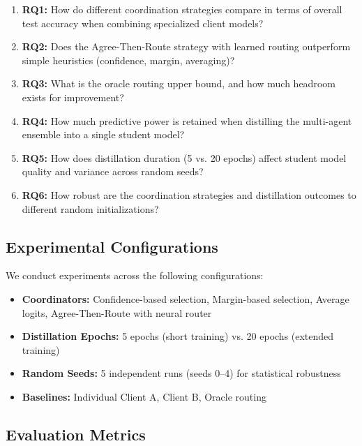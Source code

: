 \documentclass[12pt]{article}
\begin{document}
\begin{enumerate}
    \item \textbf{RQ1:} How do different coordination strategies compare in terms of overall test accuracy when combining specialized client models?
    
    \item \textbf{RQ2:} Does the Agree-Then-Route strategy with learned routing outperform simple heuristics (confidence, margin, averaging)?
    
    \item \textbf{RQ3:} What is the oracle routing upper bound, and how much headroom exists for improvement?
    
    \item \textbf{RQ4:} How much predictive power is retained when distilling the multi-agent ensemble into a single student model?
    
    \item \textbf{RQ5:} How does distillation duration (5 vs. 20 epochs) affect student model quality and variance across random seeds?
    
    \item \textbf{RQ6:} How robust are the coordination strategies and distillation outcomes to different random initializations?
\end{enumerate}

\subsection{Experimental Configurations}

We conduct experiments across the following configurations:

\begin{itemize}
    \item \textbf{Coordinators:} Confidence-based selection, Margin-based selection, Average logits, Agree-Then-Route with neural router
    \item \textbf{Distillation Epochs:} 5 epochs (short training) vs. 20 epochs (extended training)
    \item \textbf{Random Seeds:} 5 independent runs (seeds 0--4) for statistical robustness
    \item \textbf{Baselines:} Individual Client A, Client B, Oracle routing
\end{itemize}

\subsection{Evaluation Metrics}
\end{document}
